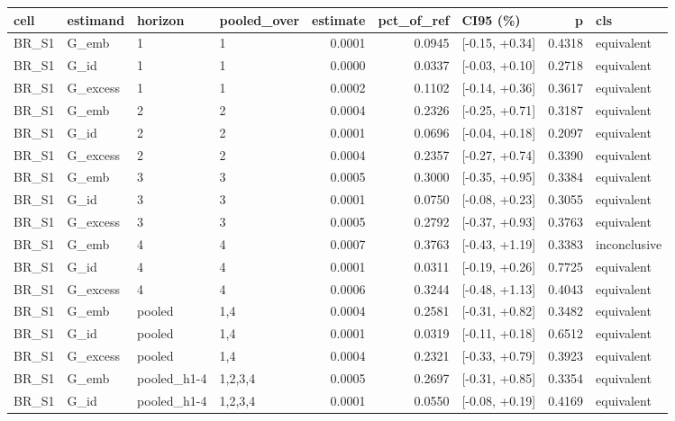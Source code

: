 \begin{tabular}{llllrrlrl}
\toprule
cell & estimand & horizon & pooled\_over & estimate & pct\_of\_ref & CI95 (\%) & p & cls \\
\midrule
BR\_S1 & G\_emb & 1 & 1 & 0.0001 & 0.0945 & [-0.15, +0.34] & 0.4318 & equivalent \\
BR\_S1 & G\_id & 1 & 1 & 0.0000 & 0.0337 & [-0.03, +0.10] & 0.2718 & equivalent \\
BR\_S1 & G\_excess & 1 & 1 & 0.0002 & 0.1102 & [-0.14, +0.36] & 0.3617 & equivalent \\
BR\_S1 & G\_emb & 2 & 2 & 0.0004 & 0.2326 & [-0.25, +0.71] & 0.3187 & equivalent \\
BR\_S1 & G\_id & 2 & 2 & 0.0001 & 0.0696 & [-0.04, +0.18] & 0.2097 & equivalent \\
BR\_S1 & G\_excess & 2 & 2 & 0.0004 & 0.2357 & [-0.27, +0.74] & 0.3390 & equivalent \\
BR\_S1 & G\_emb & 3 & 3 & 0.0005 & 0.3000 & [-0.35, +0.95] & 0.3384 & equivalent \\
BR\_S1 & G\_id & 3 & 3 & 0.0001 & 0.0750 & [-0.08, +0.23] & 0.3055 & equivalent \\
BR\_S1 & G\_excess & 3 & 3 & 0.0005 & 0.2792 & [-0.37, +0.93] & 0.3763 & equivalent \\
BR\_S1 & G\_emb & 4 & 4 & 0.0007 & 0.3763 & [-0.43, +1.19] & 0.3383 & inconclusive \\
BR\_S1 & G\_id & 4 & 4 & 0.0001 & 0.0311 & [-0.19, +0.26] & 0.7725 & equivalent \\
BR\_S1 & G\_excess & 4 & 4 & 0.0006 & 0.3244 & [-0.48, +1.13] & 0.4043 & equivalent \\
BR\_S1 & G\_emb & pooled & 1,4 & 0.0004 & 0.2581 & [-0.31, +0.82] & 0.3482 & equivalent \\
BR\_S1 & G\_id & pooled & 1,4 & 0.0001 & 0.0319 & [-0.11, +0.18] & 0.6512 & equivalent \\
BR\_S1 & G\_excess & pooled & 1,4 & 0.0004 & 0.2321 & [-0.33, +0.79] & 0.3923 & equivalent \\
BR\_S1 & G\_emb & pooled\_h1-4 & 1,2,3,4 & 0.0005 & 0.2697 & [-0.31, +0.85] & 0.3354 & equivalent \\
BR\_S1 & G\_id & pooled\_h1-4 & 1,2,3,4 & 0.0001 & 0.0550 & [-0.08, +0.19] & 0.4169 & equivalent \\

\end{tabular}
